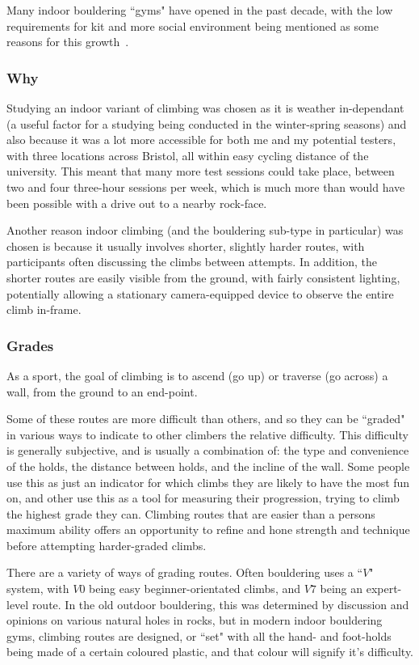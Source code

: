 Many indoor bouldering ``gyms" have opened in the past decade, with the low requirements for kit and more social environment being mentioned as some reasons for this growth~\cite{socialclimb}.

\subsubsection{Why}
Studying an indoor variant of climbing was chosen as it is weather in-dependant (a useful factor for a studying being conducted in the winter-spring seasons) and also because it was a lot more accessible for both me and my potential testers, with three locations across Bristol, all within easy cycling distance of the university.
This meant that many more test sessions could take place, between two and four three-hour sessions per week, which is much more than would have been possible with a drive out to a nearby rock-face.

Another reason indoor climbing (and the bouldering sub-type in particular) was chosen is because it usually involves shorter, slightly harder routes, with participants often discussing the climbs between attempts.
In addition, the shorter routes are easily visible from the ground, with fairly consistent lighting, potentially allowing a stationary camera-equipped device to observe the entire climb in-frame.



\subsubsection{Grades}
As a sport, the goal of climbing is to ascend (go up) or traverse (go across) a wall, from the ground to an end-point.

Some of these routes are more difficult than others, and so they can be ``graded" in various ways to indicate to other climbers the relative difficulty.
This difficulty is generally subjective, and is usually a combination of: the type and convenience of the holds, the distance between holds, and the incline of the wall.
Some people use this as just an indicator for which climbs they are likely to have the most fun on, and other use this as a tool for measuring their progression, trying to climb the highest grade they can.
Climbing routes that are easier than a persons maximum ability offers an opportunity to refine and hone strength and technique before attempting harder-graded climbs.

There are a variety of ways of grading routes.
Often bouldering uses a ``$V$" system, with $V0$ being easy beginner-orientated climbs, and $V7$ being an expert-level route.
In the old outdoor bouldering, this was determined by discussion and opinions on various natural holes in rocks, but in modern indoor bouldering gyms, climbing routes are designed, or ``set" with all the hand- and foot-holds being made of a certain coloured plastic, and that colour will signify it's difficulty.



